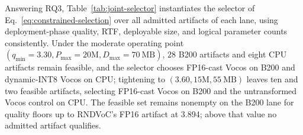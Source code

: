 Answering RQ3, Table~\ref{tab:joint-selector} instantiates the selector of
Eq.~\eqref{eq:constrained-selection} over all admitted artifacts of each
lane, using deployment-phase quality, RTF, deployable size, and logical
parameter counts consistently.  Under the moderate operating point
$(q_{\min}{=}3.30, P_{\max}{=}20\mathrm{M}, D_{\max}{=}70~\mathrm{MB})$,
28 B200 artifacts and eight CPU artifacts remain feasible, and the selector
chooses FP16-cast Vocos on B200 and dynamic-INT8 Vocos on CPU; tightening
to $(3.60, 15\mathrm{M}, 55~\mathrm{MB})$ leaves ten and two feasible
artifacts, selecting FP16-cast Vocos on B200 and the untransformed Vocos
control on CPU.  The feasible set remains nonempty on the B200 lane for
quality floors up to RNDVoC's FP16 artifact at 3.894; above that value no
admitted artifact qualifies.
